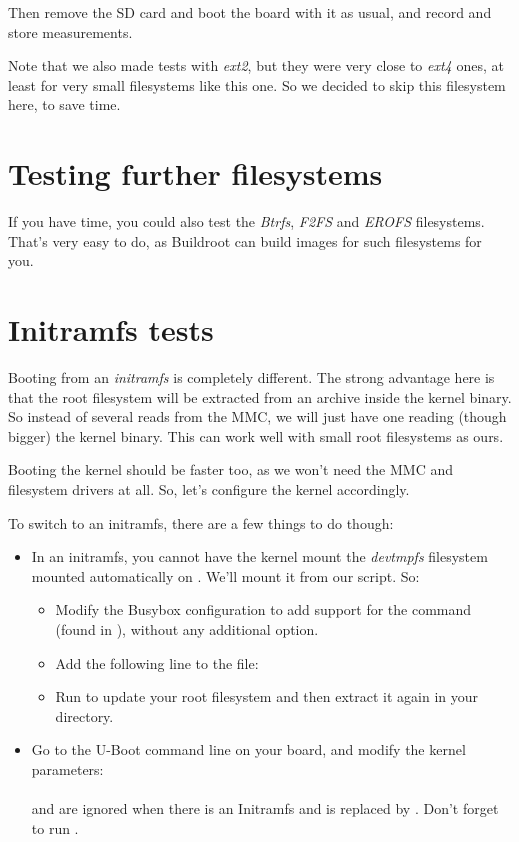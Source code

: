 Then remove the SD card and boot the board with it as usual, and record
and store measurements.

Note that we also made tests with {\em ext2}, but they were very close
to {\em ext4} ones, at least for very small filesystems like this one.
So we decided to skip this filesystem here, to save time.

\section{Testing further filesystems}

If you have time, you could also test the {\em Btrfs}, {\em F2FS} and
{\em EROFS} filesystems. That's very easy to do, as Buildroot can build
images for such filesystems for you.

\section{Initramfs tests}

Booting from an {\em initramfs} is completely different. The strong
advantage here is that the root filesystem will be extracted from an
archive inside the kernel binary. So instead of several reads from the
MMC, we will just have one reading (though bigger) the kernel binary.
This can work well with small root filesystems as ours.

Booting the kernel should be faster too, as we won't need the MMC and
filesystem drivers at all. So, let's configure the kernel accordingly.

To switch to an initramfs, there are a few things to do though:
\begin{itemize}
\item In an initramfs, you cannot have the kernel mount the {\em
devtmpfs} filesystem mounted automatically on . We'll mount
it from our  script.
So:
   \begin{itemize}
   \item Modify the Busybox configuration to add support for the
    command (found in ), without
    any additional option.
   \item Add the following line to the  file:\\
   \item Run  to update your root filesystem and then
   extract it again in your  directory.
   \end{itemize}
\item Go to the U-Boot command line on your board, and modify the
kernel parameters:\\
   \\
    and  are ignored when there is an
   Initramfs and  is replaced by .
   Don't forget to run .
\end{itemize}

